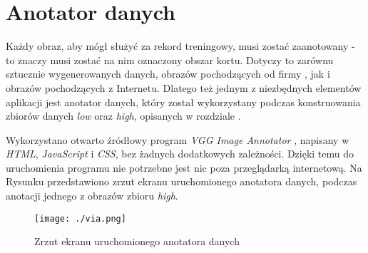 \newpage
\section{Anotator danych}

Każdy obraz, aby mógł służyć za rekord treningowy, musi zostać zaanotowany - to znaczy musi zostać na nim oznaczony obszar kortu.
Dotyczy to zarównu sztucznie wygenerowanych danych, obrazów pochodzących od firmy \blue{}, jak i obrazów pochodzących z Internetu.
Dlatego też jednym z niezbędnych elementów aplikacji jest anotator danych, który został wykorzystany podczas konstruowania zbiorów danych \textit{low} oraz \textit{high}, opisanych w rozdziale .

Wykorzystano otwarto źródłowy program \textit{VGG Image Annotator} \cite{dutta2016via} \cite{dutta2019vgg}, napisany w \textit{HTML}, \textit{JavaScript} i \textit{CSS}, bez żadnych dodatkowych zależności.
Dzięki temu do uruchomienia programu nie potrzebne jest nic poza przeglądarką internetową.
Na Rysunku  przedstawiono zrzut ekranu uruchomionego anotatora danych, podczas anotacji jednego z obrazów zbioru  \textit{high}.

\vspace{1cm}

\begin{figure}[!htb]
  \texttt{[image: ./via.png]}
    \caption{Zrzut ekranu uruchomionego anotatora danych}
    \label{fig:via}
\end{figure}
